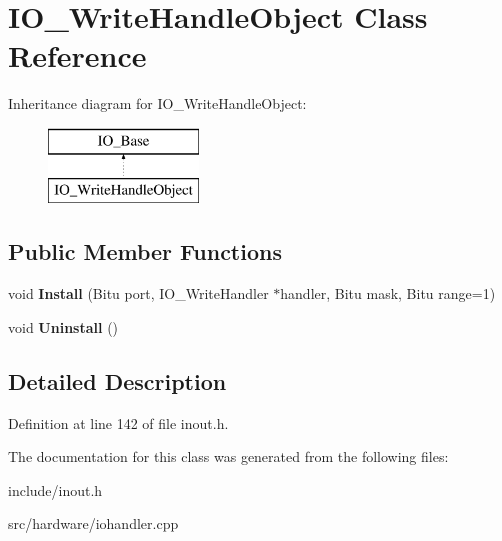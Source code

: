 \hypertarget{classIO__WriteHandleObject}{\section{I\-O\-\_\-\-Write\-Handle\-Object Class Reference}
\label{classIO__WriteHandleObject}
}
Inheritance diagram for I\-O\-\_\-\-Write\-Handle\-Object\-:\begin{figure}[H]
\begin{center}
\leavevmode
\includegraphics[height=2.000000cm]{classIO__WriteHandleObject}
\end{center}
\end{figure}
\subsection*{Public Member Functions}
\begin{DoxyCompactItemize}
\item 
\hypertarget{classIO__WriteHandleObject_a6c095de12fb7ea25bced97029044c6b7}{void {\bfseries Install} (Bitu port, I\-O\-\_\-\-Write\-Handler $\ast$handler, Bitu mask, Bitu range=1)}\label{classIO__WriteHandleObject_a6c095de12fb7ea25bced97029044c6b7}

\item 
\hypertarget{classIO__WriteHandleObject_a52ac1839f892f2e2267a5a97a14c7385}{void {\bfseries Uninstall} ()}\label{classIO__WriteHandleObject_a52ac1839f892f2e2267a5a97a14c7385}

\end{DoxyCompactItemize}


\subsection{Detailed Description}


Definition at line 142 of file inout.\-h.



The documentation for this class was generated from the following files\-:\begin{DoxyCompactItemize}
\item 
include/inout.\-h\item 
src/hardware/iohandler.\-cpp\end{DoxyCompactItemize}
